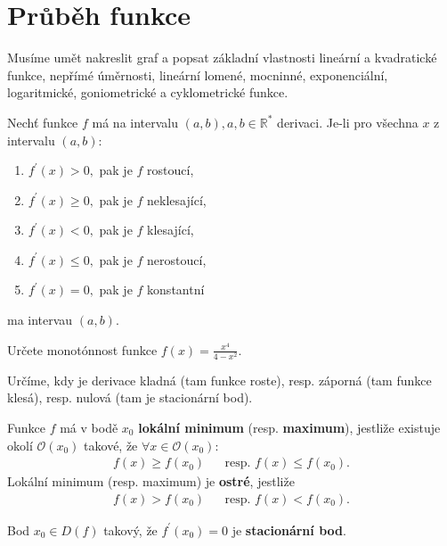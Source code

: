 \section{Průběh funkce}
\begin{pozn}
    Musíme umět nakreslit graf a popsat základní vlastnosti lineární a
    kvadratické funkce, nepřímé úměrnosti, lineární lomené, mocninné, exponenciální,
    logaritmické, goniometrické a cyklometrické funkce.
\end{pozn}

\begin{veta}
Nechť funkce $f$ má na intervalu $(a,b),a,b\in \mathbb R^*$ derivaci. Je-li pro
všechna $x$ z intervalu $(a,b)$:
\begin{enumerate}[$i.$]
\item $f^\prime(x)>0,$ pak je $f$ rostoucí,
\item $f^\prime(x)\geq 0,$ pak je $f$ neklesající,
\item $f^\prime(x)<0,$ pak je $f$ klesající,
\item $f^\prime(x) \leq 0,$ pak je $f$ nerostoucí,
\item $f^\prime(x)=0,$ pak je $f$ konstantní
\end{enumerate}
ma intervau $(a,b).$
\end{veta}

\begin{priklad}
Určete monotónnost funkce $f(x)=\frac{x^4}{4-x^2}$.
\end{priklad}

\begin{reseni}
Určíme, kdy je derivace kladná (tam funkce roste), resp. záporná (tam funkce klesá),
resp. nulová (tam je stacionární bod).
\end{reseni}

\begin{definition}
Funkce $f$ má v bodě $x_0$ \textbf{lokální minimum} (resp. \textbf{maximum}),
jestliže existuje okolí $\mathscr O(x_0)$ takové, že $\forall x \in \mathscr O(x_0):$
\begin{align*}
    f(x)\geq f(x_0) & & \textrm{resp. } f(x)\leq f(x_0).
\end{align*}
Lokální minimum (resp. maximum) je \textbf{ostré}, jestliže
\begin{align*}
    f(x)> f(x_0) & & \textrm{resp. } f(x)<f(x_0).
\end{align*}
\end{definition}

\begin{definition}
Bod $x_0\in D(f)$ takový, že $f^\prime(x_0)=0$ je \textbf{stacionární bod}.
\end{definition}


